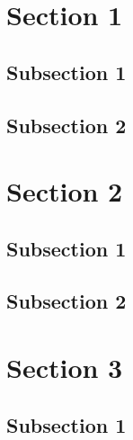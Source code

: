 \documentclass[compress]{beamer}
\begin{document}
\section{Section 1}
\subsection{Subsection 1}
\frame{}\frame{}\frame{}
\subsection{Subsection 2}
\frame{}\frame{}
\section{Section 2}
\subsection{Subsection 1}
\frame{}
\subsection{Subsection 2}
\frame{}\frame{}\frame{}\frame{}\frame{}\frame{}
\section{Section 3}
\subsection{Subsection 1}
\frame{}\frame{}\frame{}\frame{}\frame{}\frame{}
\end{document}
